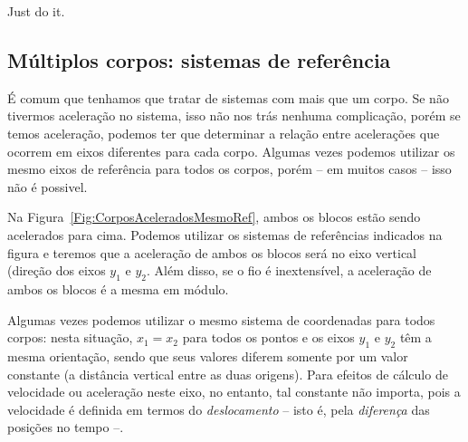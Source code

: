 \textrm{Just do it.}

\subsection{Múltiplos corpos: sistemas de referência}

É comum que tenhamos que tratar de sistemas com mais que um corpo. Se não tivermos aceleração no sistema, isso não nos trás nenhuma complicação, porém se temos aceleração, podemos ter que determinar a relação entre acelerações que ocorrem em eixos diferentes para cada corpo. Algumas vezes podemos utilizar os mesmo eixos de referência para todos os corpos, porém -- em muitos casos -- isso não é possivel.

Na Figura~\ref{Fig:CorposAceleradosMesmoRef}, ambos os blocos estão sendo acelerados para cima. Podemos utilizar os sistemas de referências indicados na figura e teremos que a aceleração de ambos os blocos será no eixo vertical (direção dos eixos $y_1$ e $y_2$. Além disso, se o fio é inextensível, a aceleração de ambos os blocos é a mesma em módulo. 

\begin{marginfigure}
\centering
{}
\caption{Algumas vezes podemos utilizar o mesmo sistema de coordenadas para todos corpos: nesta situação, $x_1=x_2$ para todos os pontos e os eixos $y_1$ e $y_2$ têm a mesma orientação, sendo que seus valores diferem somente por um valor constante (a distância vertical entre as duas origens). Para efeitos de cálculo de velocidade ou aceleração neste eixo, no entanto, tal constante não importa, pois a velocidade é definida em termos do \emph{deslocamento} -- isto é, pela \emph{diferença} das posições no tempo --.\label{Fig:CorposAceleradosMesmoRef}}
\end{marginfigure}

